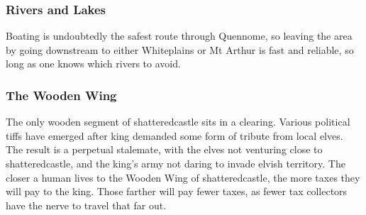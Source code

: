 \begin{multicols}{2}
{}

\subsubsection{Rivers and Lakes}

Boating is undoubtedly the safest route through Quennome, so leaving the area by going downstream to either Whiteplains or Mt Arthur is fast and reliable, so long as one knows which rivers to avoid.

\subsubsection{The Wooden Wing}

The only wooden segment of \gls{shatteredcastle} sits in a clearing.
Various political tiffs have emerged after \gls{king} demanded some form of tribute from local elves.
The result is a perpetual stalemate, with the elves not venturing close to \gls{shatteredcastle}, and the king's army not daring to invade elvish territory.
The closer a human lives to the Wooden Wing of \gls{shatteredcastle}, the more taxes they will pay to the king.
Those farther will pay fewer taxes, as fewer tax collectors have the nerve to travel that far out.

\iftoggle{players}{}{

\subsubsection{Seasonal Encounters}

\paragraph{Cold} seasons bring stormy weather and wolves.
Each day of travel inflicts an additional 3 Fatigue Points, and when this encounter is rolled, the PCs are followed by $3D6$ wolves.

\paragraph{Mild} seasons are relatively safe.
Have the party encounter a wandering bear.

\paragraph{Stormy} weather can flood places, meaning the rivers become dangerous to navigate by boat, and once-dry land can become a temporary swamp.
Anyone in a boat rolls Wits + Seafaring, TN 9, or capsizes or otherwise loses control of the vessel.
Those wandering the forests get the choice of climbing a tree and hoping the waters subside soon, or wading through dank sludge.

}
\end{multicols}
